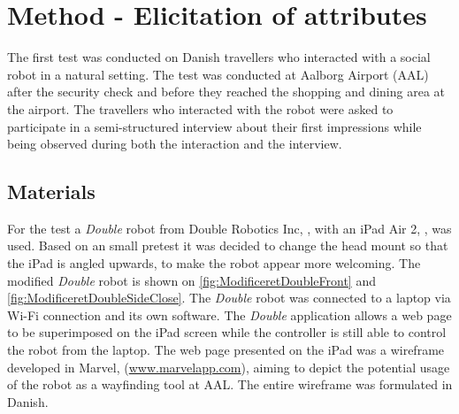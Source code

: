 \section{Method - Elicitation of attributes}
\label{MethodElicitation}
%
The first test was conducted on Danish travellers who interacted with a social robot in a natural setting. The test was conducted at Aalborg Airport (AAL) after the security check and before they reached the shopping and dining area at the airport. The travellers who interacted with the robot were asked to participate in a semi-structured interview about their first impressions while being observed during both the interaction and the interview. 

\subsection{Materials}
For the test a \textit{Double} robot from Double Robotics Inc, \cite{WEB:Double}, with an iPad Air 2, \cite{WEB:iPadAir2}, was used. Based on an small pretest it was decided to change the head mount so that the iPad is angled upwards, to make the robot appear more welcoming. The modified \textit{Double} robot is shown on \autoref{fig:ModificeretDoubleFront} and \autoref{fig:ModificeretDoubleSideClose}. The \textit{Double} robot was connected to a laptop via Wi-Fi connection and its own software. The \textit{Double} application allows a web page to be superimposed on the iPad screen while the controller is still able to control the robot from the laptop. The web page presented on the iPad was a wireframe developed in Marvel, (\url{www.marvelapp.com}), aiming to depict the potential usage of the robot as a wayfinding tool at AAL. The entire wireframe was formulated in Danish.

